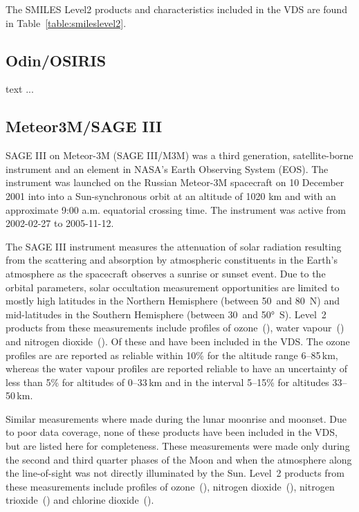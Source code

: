 The SMILES Level2 products and characteristics included in the
VDS are found in Table~\ref{table:smileslevel2}.


\subsection{Odin/OSIRIS}
 
text ...

\subsection{Meteor3M/SAGE III}
SAGE III on Meteor-3M (SAGE III/M3M) was a third generation, satellite-borne
instrument and an element in NASA’s Earth Observing System (EOS). The
instrument was launched on the Russian Meteor-3M spacecraft on 10 December 2001
into into a Sun-synchronous orbit at an altitude of 1020 km and with an
approximate 9:00 a.m. equatorial crossing time.  The instrument was active from
2002-02-27 to 2005-11-12.

The SAGE III instrument measures the attenuation of solar radiation resulting
from the scattering and absorption by atmospheric constituents in the Earth’s
atmosphere as the spacecraft observes a sunrise or sunset event.  Due to the
orbital parameters, solar occultation measurement opportunities are limited to
mostly high latitudes in the Northern Hemisphere (between 50\degree~and
80\degree~N) and mid-latitudes in the Southern Hemisphere (between
30\degree~and 50°~S).  Level~2 products from these measurements include
profiles of ozone~(), water vapour~() and nitrogen
dioxide~().  Of these  and  have been included
in the VDS.  The ozone profiles are are reported as reliable within 10\% for
the altitude range 6--85\,km, whereas the water vapour profiles are reported
reliable to have an uncertainty of less than 5\% for altitudes of 0--33\,km and
in the interval 5--15\% for altitudes 33--50\,km.

Similar measurements where made during the lunar moonrise and moonset. Due to
poor data coverage, none of these products have been included in the VDS, but
are listed here for completeness.  These measurements were made only during the
second and third quarter phases of the Moon and when the atmosphere along the
line-of-sight was not directly illuminated by the Sun.  Level~2 products from
these measurements include profiles of ozone~(), nitrogen
dioxide~(), nitrogen trioxide~() and chlorine
dioxide~().




